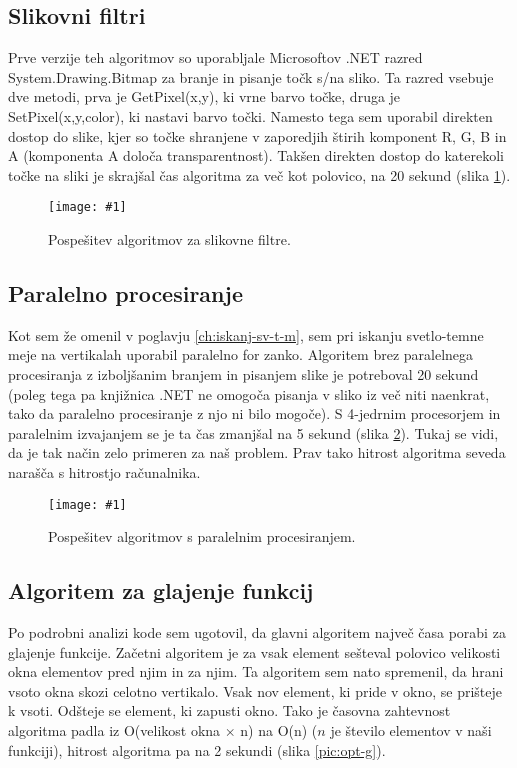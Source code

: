 \documentclass[oneside, a4paper, 12pt]{book}
\newcommand{\slika}[3]{
	\begin{figure}
	\begin{center}
	\texttt{[image: \#1]}
	\end{center}
	\vspace{-20pt}
	\caption{#2}
	\label{#3}
	\end{figure}
}
\begin{document}
\subsection{Slikovni filtri}
Prve verzije teh algoritmov so uporabljale Microsoftov .NET razred System.\-Drawing.\-Bitmap za branje in pisanje točk s/na sliko. Ta razred vsebuje dve metodi, prva je GetPixel(x,y), ki vrne barvo točke, druga je SetPixel(x,y,color), ki nastavi barvo točki. Namesto tega sem uporabil direkten dostop do slike, kjer so točke shranjene v zaporedjih štirih komponent R, G, B in A (komponenta A določa transparentnost). Takšen direkten dostop do katerekoli točke na sliki je skrajšal čas algoritma za več kot polovico, na 20 sekund (slika \ref{pic:opt-sf}).



\slika{slike/optimizacija_grafi/optimizacija-slikovnih-filtrov.jpg}{Pospešitev algoritmov za slikovne filtre.}{pic:opt-sf}


\subsection{Paralelno procesiranje}
Kot sem že omenil v poglavju \ref{ch:iskanj-sv-t-m}, sem pri iskanju svetlo-temne meje na vertikalah uporabil paralelno for zanko. Algoritem brez paralelnega procesiranja z izboljšanim branjem in pisanjem slike je potreboval 20 sekund (poleg tega pa knjižnica .NET ne omogoča pisanja v sliko iz več niti naenkrat, tako da paralelno procesiranje z njo ni bilo mogoče). S 4-jedrnim procesorjem in paralelnim izvajanjem se je ta čas zmanjšal na 5 sekund (slika \ref{pic:opt-p}). Tukaj se vidi, da je tak način zelo primeren za naš problem. Prav tako hitrost algoritma seveda narašča s hitrostjo računalnika.


\slika{slike/optimizacija_grafi/optimizacija-s-paralelnim-procesiranjem.jpg}{Pospešitev algoritmov s paralelnim procesiranjem.}{pic:opt-p}

\subsection{Algoritem za glajenje funkcij}
Po podrobni analizi kode sem ugotovil, da glavni algoritem največ časa porabi za glajenje funkcije. Začetni algoritem je za vsak element sešteval polovico velikosti okna elementov pred njim in za njim. Ta algoritem sem nato spremenil, da hrani vsoto okna skozi celotno vertikalo. Vsak nov element, ki pride v okno, se prišteje k vsoti. Odšteje se element, ki zapusti okno. Tako je časovna zahtevnost algoritma padla iz O(velikost okna $\times$ n) na O(n) ($n$ je število elementov v naši funkciji), hitrost algoritma pa na 2 sekundi (slika \ref{pic:opt-g}).
\end{document}
